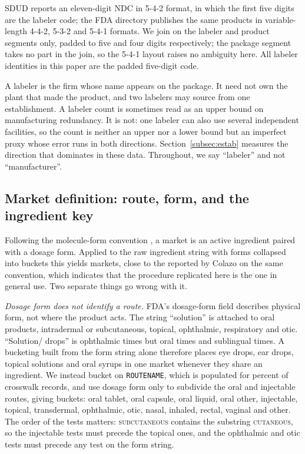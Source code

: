 \documentclass[pdflatex,sn-vancouver-num,Numbered]{sn-jnl}
\begin{document}
SDUD reports an eleven-digit NDC in 5-4-2 format, in which the first five digits are the labeler
code; the FDA directory publishes the same products in variable-length 4-4-2, 5-3-2 and 5-4-1
formats. We join on the labeler and product segments only, padded to five and four digits
respectively; the package segment takes no part in the join, so the 5-4-1 layout raises no
ambiguity here. All labeler identities in this paper are the padded five-digit code.

A labeler is the firm whose name appears on the package. It need not own the plant that made the
product, and two labelers may source from one establishment. A labeler count is sometimes read as an upper bound on
manufacturing redundancy. It is not: one labeler can also use several independent facilities, so
the count is neither an upper nor a lower bound but an
imperfect proxy whose error runs in both directions. Section~\ref{subsec:estab} measures the
direction that dominates in these data. Throughout, we say ``labeler'' and not
``manufacturer''.

\subsection{Market definition: route, form, and the ingredient key}\label{subsec:market}

Following the molecule-form convention \cite{berndt2017,conti2020}, a market is an active
ingredient paired with a dosage form. Applied to the raw ingredient string with forms collapsed
into \nFormBucketsW buckets this yields \nFormBucketMarkets markets, close to the \nColazoMarkets reported by
Colazo \cite{colazo2026} on the same convention, which indicates that the procedure replicated
here is the one in general use. Two separate things go wrong with it.

\emph{Dosage form does not identify a route.} FDA's dosage-form field describes physical form,
not where the product acts. The string ``solution'' is attached to \nSolutionOral oral products,
\nSolutionIntra intradermal or subcutaneous, \nSolutionTopical topical, \nSolutionOphth ophthalmic, \nSolutionResp respiratory and \nSolutionOtic
otic. ``Solution/ drops'' is ophthalmic \nDropsOphth times but oral \nDropsOral times and sublingual \nDropsSub times.
A bucketing built from the form string alone therefore places eye drops, ear drops, topical
solutions and oral syrups in one market whenever they share an ingredient. We instead bucket on
\texttt{ROUTENAME}, which is populated for \nRouteCovRec percent of crosswalk records, and use dosage form
only to subdivide the oral and injectable routes, giving \nBucketsW buckets: oral tablet, oral
capsule, oral liquid, oral other, injectable, topical, transdermal, ophthalmic, otic, nasal,
inhaled, rectal, vaginal and other. The order of the tests matters: \textsc{subcutaneous}
contains the substring \textsc{cutaneous}, so the injectable tests must precede the topical ones,
and the ophthalmic and otic tests must precede any test on the form string.
\end{document}
